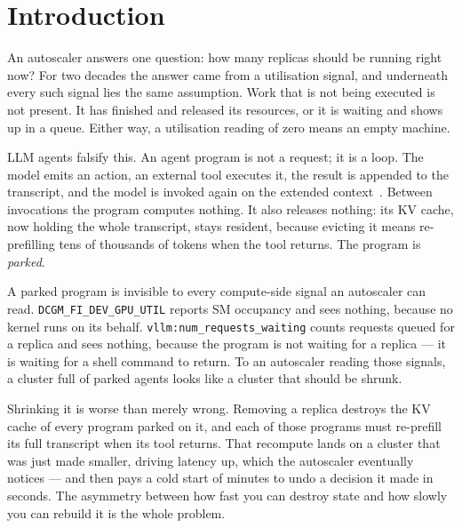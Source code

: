 \documentclass[sigconf,nonacm]{acmart}
\newcommand{\code}[1]{\texttt{\small #1}}
\begin{document}
\maketitle

\section{Introduction}

An autoscaler answers one question: how many replicas should be running
right now? For two decades the answer came from a utilisation signal, and
underneath every such signal lies the same assumption. Work that is not
being executed is not present. It has finished and released its
resources, or it is waiting and shows up in a queue. Either way, a
utilisation reading of zero means an empty machine.

LLM agents falsify this. An agent program is not a request; it is a loop.
The model emits an action, an external tool executes it, the result is
appended to the transcript, and the model is invoked again on the extended
context~\cite{react}. Between invocations the program computes nothing.
It also releases nothing: its KV cache, now holding the whole transcript,
stays resident, because evicting it means re-prefilling tens of thousands
of tokens when the tool returns. The program is \emph{parked}.

A parked program is invisible to every compute-side signal an autoscaler
can read. \code{DCGM\_FI\_DEV\_GPU\_UTIL} reports SM occupancy and sees
nothing, because no kernel runs on its behalf.
\code{vllm:num\_requests\_waiting} counts requests queued for a replica
and sees nothing, because the program is not waiting for a replica --- it
is waiting for a shell command to return. To an autoscaler reading those
signals, a cluster full of parked agents looks like a cluster that should
be shrunk.

Shrinking it is worse than merely wrong. Removing a replica destroys the
KV cache of every program parked on it, and each of those programs must
re-prefill its full transcript when its tool returns. That recompute
lands on a cluster that was just made smaller, driving latency up, which
the autoscaler eventually notices --- and then pays a cold start of
minutes to undo a decision it made in seconds. The asymmetry between how
fast you can destroy state and how slowly you can rebuild it is the whole
problem.
\end{document}
